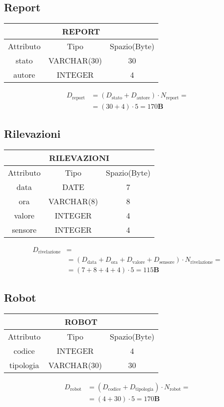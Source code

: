 \subsection{Report}
\begin{tabular}{|c|c|c|}
  \hline
  \multicolumn{3}{|c|}{\textbf{REPORT}}\\
  \hline
  Attributo & Tipo & Spazio(Byte) \\
  \hline
  stato & VARCHAR(30) & 30 \\
  autore & INTEGER & 4\\
  \hline
\end{tabular}
\begin{equation}
  \begin{aligned}
    D_{\text{report}} &=(D_{\text{stato}}+D_{\text{autore}})\cdot N_{\text{report}}=\\
    &=(30+4)\cdot 5 = 170\textbf{B}
  \end{aligned}
\end{equation}
\subsection{Rilevazioni}
\begin{tabular}{|c|c|c|}
  \hline
  \multicolumn{3}{|c|}{\textbf{RILEVAZIONI}}\\
  \hline
  Attributo & Tipo & Spazio(Byte) \\
  \hline
  data & DATE & 7 \\
  ora & VARCHAR(8)  & 8\\
  valore & INTEGER & 4 \\
  sensore & INTEGER & 4 \\
  \hline
\end{tabular}
\begin{equation}
  \begin{aligned}
    D_{\text{rivelazione}} &=\\
    &=(D_{\text{data}}+D_{\text{ora}}+D_{\text{valore}}+D_{\text{sensore}})\cdot N_{\text{rivelazione}}=\\
    &=(7+8+4+4)\cdot 5 = 115\textbf{B}
  \end{aligned}
\end{equation}
\subsection{Robot}
\begin{tabular}{ |c|c|c|}
  \hline
  \multicolumn{3}{|c|}{\textbf{ROBOT}}\\
  \hline
  Attributo & Tipo & Spazio(Byte) \\
  \hline
  codice & INTEGER & 4\\
  tipologia & VARCHAR(30) & 30\\
  \hline
\end{tabular}
\begin{equation}
  \begin{aligned}
    D_{\text{robot}} &=(D_{\text{codice}}+D_{\text{tipologia}})\cdot N_{\text{robot}}=\\
    &=(4+30)\cdot 5 = 170\textbf{B}
  \end{aligned}
\end{equation}
